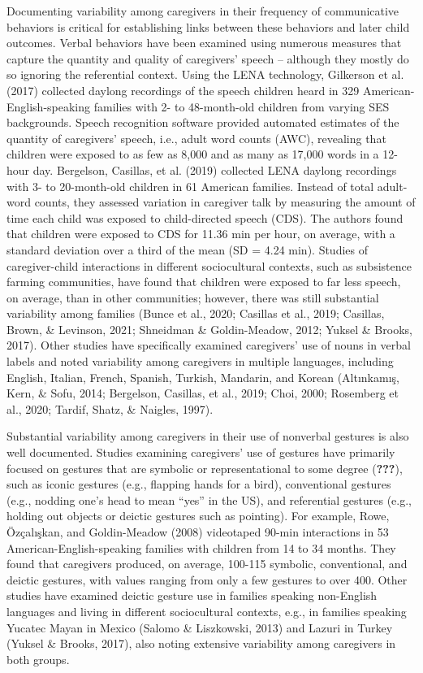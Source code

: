 \documentclass[
  english,
  man,mask]{apa6}
\begin{document}
Documenting variability among caregivers in their frequency of communicative behaviors is critical for establishing links between these behaviors and later child outcomes. Verbal behaviors have been examined using numerous measures that capture the quantity and quality of caregivers' speech -- although they mostly do so ignoring the referential context. Using the LENA technology, Gilkerson et al. (2017) collected daylong recordings of the speech children heard in 329 American-English-speaking families with 2- to 48-month-old children from varying SES backgrounds. Speech recognition software provided automated estimates of the quantity of caregivers' speech, i.e., adult word counts (AWC), revealing that children were exposed to as few as 8,000 and as many as 17,000 words in a 12-hour day. Bergelson, Casillas, et al. (2019) collected LENA daylong recordings with 3- to 20-month-old children in 61 American families. Instead of total adult-word counts, they assessed variation in caregiver talk by measuring the amount of time each child was exposed to child-directed speech (CDS). The authors found that children were exposed to CDS for 11.36 min per hour, on average, with a standard deviation over a third of the mean (SD = 4.24 min). Studies of caregiver-child interactions in different sociocultural contexts, such as subsistence farming communities, have found that children were exposed to far less speech, on average, than in other communities; however, there was still substantial variability among families (Bunce et al., 2020; Casillas et al., 2019; Casillas, Brown, \& Levinson, 2021; Shneidman \& Goldin-Meadow, 2012; Yuksel \& Brooks, 2017). Other studies have specifically examined caregivers' use of nouns in verbal labels and noted variability among caregivers in multiple languages, including English, Italian, French, Spanish, Turkish, Mandarin, and Korean (Altınkamış, Kern, \& Sofu, 2014; Bergelson, Casillas, et al., 2019; Choi, 2000; Rosemberg et al., 2020; Tardif, Shatz, \& Naigles, 1997).

Substantial variability among caregivers in their use of nonverbal gestures is also well documented. Studies examining caregivers' use of gestures have primarily focused on gestures that are symbolic or representational to some degree ({\textbf{???}}), such as iconic gestures (e.g., flapping hands for a bird), conventional gestures (e.g., nodding one's head to mean \enquote{yes} in the US), and referential gestures (e.g., holding out objects or deictic gestures such as pointing). For example, Rowe, Özçalışkan, and Goldin-Meadow (2008) videotaped 90-min interactions in 53 American-English-speaking families with children from 14 to 34 months. They found that caregivers produced, on average, 100-115 symbolic, conventional, and deictic gestures, with values ranging from only a few gestures to over 400. Other studies have examined deictic gesture use in families speaking non-English languages and living in different sociocultural contexts, e.g., in families speaking Yucatec Mayan in Mexico (Salomo \& Liszkowski, 2013) and Lazuri in Turkey (Yuksel \& Brooks, 2017), also noting extensive variability among caregivers in both groups.
\end{document}
